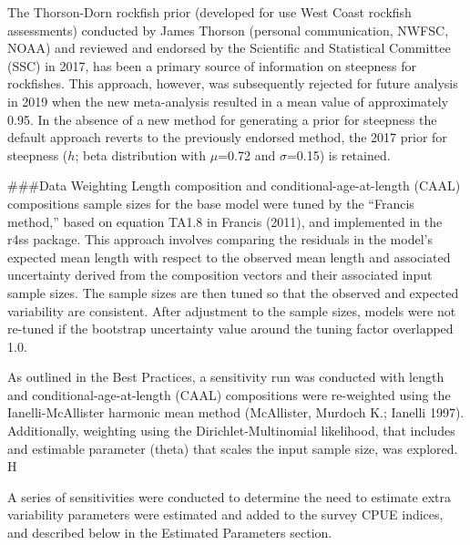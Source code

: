 \documentclass[11pt,
  english,
  a4paper,
]{article}
\begin{document}
\leavevmode\tagmcend\tagstructend

The Thorson-Dorn rockfish prior (developed for use West Coast rockfish assessments) conducted by James Thorson (personal communication, NWFSC, NOAA) and reviewed and endorsed by the Scientific and Statistical Committee (SSC) in 2017, has been a primary source of information on steepness for rockfishes. This approach, however, was subsequently rejected for future analysis in 2019 when the new meta-analysis resulted in a mean value of approximately 0.95. In the absence of a new method for generating a prior for steepness the default approach reverts to the previously endorsed method, the 2017 prior for steepness ({\(h\)\leavevmode\tagmcend\tagstructend}; beta distribution with {\(\mu\)\leavevmode\tagmcend\tagstructend}=0.72 and {\(\sigma\)\leavevmode\tagmcend\tagstructend}=0.15) is retained.

\#\#\#Data Weighting Length composition and conditional-age-at-length (CAAL) compositions sample sizes for the base model were tuned by the ``Francis method,'' based on equation TA1.8 in Francis {(2011)\leavevmode\tagmcend\tagstructend}, and implemented in the r4ss package. This approach involves comparing the residuals in the model's expected mean length with respect to the observed mean length and associated uncertainty derived from the composition vectors and their associated input sample sizes. The sample sizes are then tuned so that the observed and expected variability are consistent. After adjustment to the sample sizes, models were not re-tuned if the bootstrap uncertainty value around the tuning factor overlapped 1.0.

As outlined in the Best Practices, a sensitivity run was conducted with length and conditional-age-at-length (CAAL) compositions were re-weighted using the Ianelli-McAllister harmonic mean method {(McAllister, Murdoch K.; Ianelli 1997)\leavevmode\tagmcend\tagstructend}. Additionally, weighting using the Dirichlet-Multinomial likelihood, that includes and estimable parameter (theta) that scales the input sample size, was explored. H

A series of sensitivities were conducted to determine the need to estimate extra variability parameters were estimated and added to the survey CPUE indices, and described below in the Estimated Parameters section.
\end{document}
